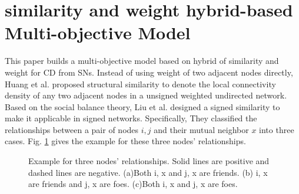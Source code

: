 \documentclass[10pt, journal]{IEEEtran}
\begin{document}
\section{similarity and weight hybrid-based Multi-objective Model}\label{section:objectives}
This paper builds a multi-objective model based on hybrid of similarity and weight for CD from SNs. 
Instead of using weight of two adjacent nodes directly, Huang et al.  proposed structural similarity to denote the local connectivity density of any two adjacent nodes in  a unsigned weighted undirected network. 
Based on the social balance theory, Liu et al. designed a signed similarity to make it applicable in signed networks. Specifically, They classified the relationships between a pair of nodes $i, j$ and their mutual neighbor $x$ into three cases. Fig. \ref{fig:CAEAh-SN:case} gives the example for these three nodes' relationships. 
\begin{figure}[!htbp]
 	\centering
 	\caption{Example for three nodes' relationships. Solid lines are positive and dashed lines are negative. (a)Both i, x and j, x are friends. (b) i, x are friends and j, x are foes. (c)Both i, x and j, x are foes.}
 	\label{fig:CAEAh-SN:case}
 \end{figure}
\end{document}
